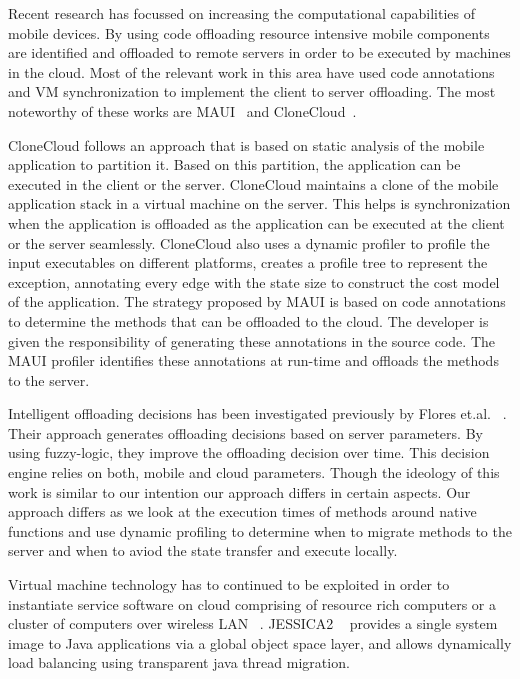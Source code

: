 Recent research has focussed on increasing the computational capabilities of mobile devices. By using code offloading
resource intensive mobile components are identified and offloaded to remote servers in order to be executed
by machines in the cloud. Most of the relevant work in this area have used code annotations and VM synchronization to
implement the client to server offloading. The most noteworthy of these works are MAUI~\cite{maui} and CloneCloud~\cite{ccloud}.

CloneCloud follows an approach that is based on static analysis of the mobile application to partition it.
Based on this partition, the application can be executed in the client or the server. CloneCloud maintains
a clone of the mobile application stack in a virtual machine on the server. This helps is synchronization
when the application is offloaded as the application can be executed at the client or the server seamlessly.
CloneCloud also uses a dynamic profiler to profile the input executables on different platforms, creates a profile
tree to represent the exception, annotating every edge with the state size to construct the cost model of the application.
The strategy proposed by MAUI is based on code annotations to determine the methods that can be offloaded to the
cloud. The developer is given the responsibility of generating these annotations in the source code. The MAUI
profiler identifies these annotations at run-time and offloads the methods to the server.

Intelligent offloading decisions has been investigated previously by Flores et.al. ~\cite{fuzzy}. Their approach
generates offloading decisions based on server parameters. By using fuzzy-logic, they improve the offloading decision
over time. This decision engine relies on both, mobile and cloud parameters. Though the ideology of this work is similar
to our intention our approach differs in certain aspects. Our approach differs as we look
at the execution times of methods around native functions and use dynamic profiling to determine when to migrate methods
to the server and when to aviod the state transfer and execute locally.

Virtual machine technology has to continued to be exploited in order to instantiate service software on cloud comprising of resource rich computers or a cluster of computers over wireless LAN ~\cite{satya}. JESSICA2 ~\cite{jessica} provides a single system image to Java applications via a global object space layer, and allows dynamically load balancing using transparent java thread migration.
